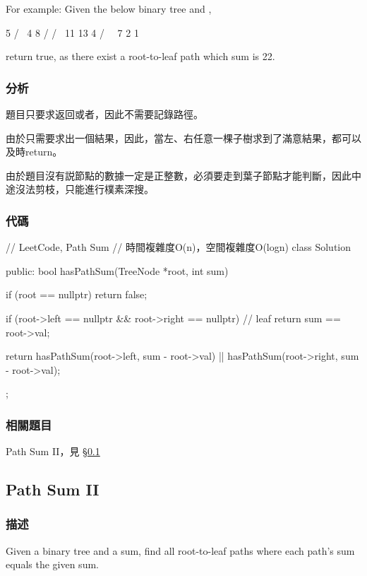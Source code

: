 For example:
Given the below binary tree and ,
\begin{Code}
          5
         / \
        4   8
       /   / \
      11  13  4
     /  \      \
    7    2      1
\end{Code}
return true, as there exist a root-to-leaf path  which sum is 22.


\subsubsection{分析}
題目只要求返回或者，因此不需要記錄路徑。

由於只需要求出一個結果，因此，當左、右任意一棵子樹求到了滿意結果，都可以及時return。

由於題目沒有説節點的數據一定是正整數，必須要走到葉子節點才能判斷，因此中途沒法剪枝，只能進行樸素深搜。

\subsubsection{代碼}

\begin{Code}
// LeetCode, Path Sum
// 時間複雜度O(n)，空間複雜度O(logn)
class Solution {
public:
    bool hasPathSum(TreeNode *root, int sum) {
        if (root == nullptr) return false;

        if (root->left == nullptr && root->right == nullptr) // leaf
            return sum == root->val;

        return hasPathSum(root->left, sum - root->val)
                || hasPathSum(root->right, sum - root->val);
    }
};
\end{Code}


\subsubsection{相關題目}
\begindot
\item Path Sum II，見 \S \ref{sec:path-sum-ii}
\myenddot


\subsection{Path Sum II}
\label{sec:path-sum-ii}


\subsubsection{描述}
Given a binary tree and a sum, find all root-to-leaf paths where each path's sum equals the given sum.

